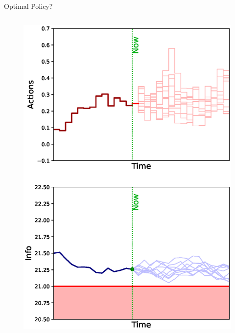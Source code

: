 \documentclass[lecture]{beamer}
\begin{document}
\begin{frame}{\normalsize Optimal Policy?}
\begin{columns}[t]
{\begin{overlayarea}{\textwidth}{0.8\textheight}
\begin{figure}
{        }%
        {%
          \includegraphics[width=.8\textwidth]{Codes/Basics/Policy13.eps}%
        }%
    \end{figure}
  \end{overlayarea}  }
  
  

\end{columns}



\end{frame}
\end{document}
